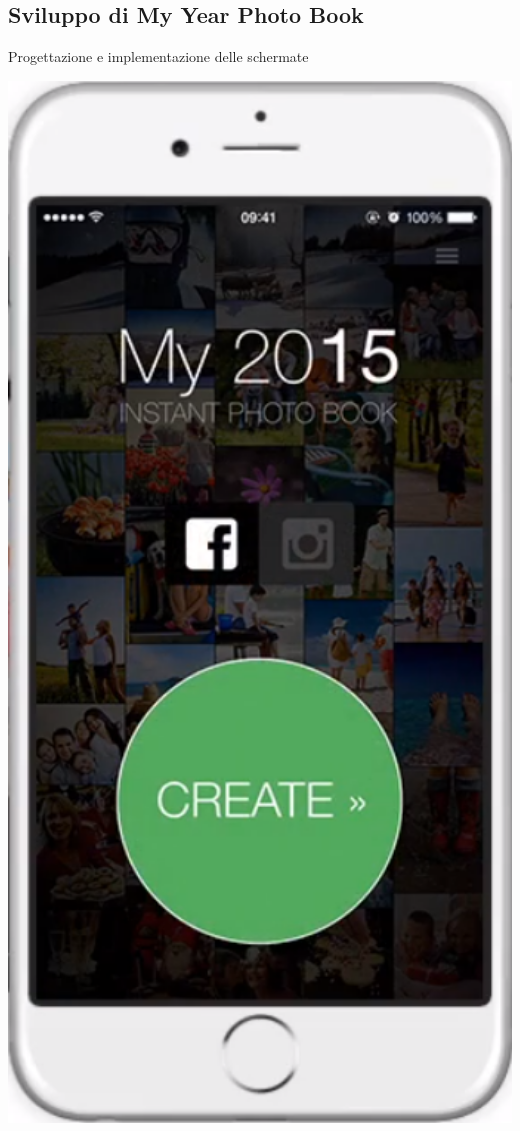 	\subsection{Sviluppo di My Year Photo Book}
		\begin{frame}{Progettazione e implementazione delle schermate}
			\begin{minipage}{0.49\textwidth}
				\begin{minipage}{0.32\textwidth}
					\includegraphics[width=1.0\textwidth]{capitolo_3/immagini/schermata_principale.png}

\end{minipage}
\end{minipage}
\end{frame}
